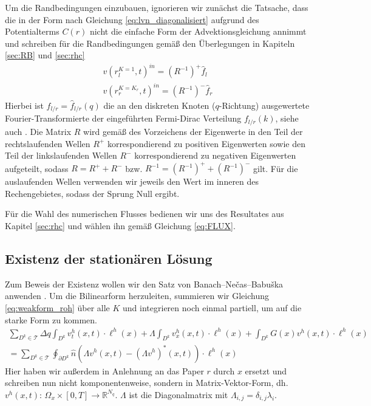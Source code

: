 Um die Randbedingungen einzubauen, ignorieren wir zunächst die Tatsache, dass die \lvn in der Form nach Gleichung \eqref{eq:lvn_diagonalisiert} aufgrund des Potentialterms $C(r)$ nicht die einfache Form der Advektionsgleichung annimmt und schreiben für die Randbedingungen gemäß den Überlegungen in Kapiteln \ref{sec:RB} und \ref{sec:rhc}
\begin{align}
  v(r_l^{K=1}, t)^{in} = (R^{-1})^+ \hat{f}_l  \\
  v(r_r^{K=K_r},t)^{in} = (R^{-1})^- \hat{f}_r
\end{align}
Hierbei ist $\hat{f}_{l/r} = \hat{f}_{l/r}(q)$ die an den diskreten  Knoten ($q$-Richtung) ausgewertete Fourier-Transformierte der eingeführten Fermi-Dirac Verteilung $f_{l/r}(k)$, siehe auch \cite{lukas1}. Die Matrix $R$ wird gemäß des Vorzeichens der Eigenwerte in den Teil der rechtslaufenden Wellen $R^+$ korrespondierend zu positiven Eigenwerten sowie den Teil der linkslaufenden Wellen $R^-$ korrespondierend zu negativen Eigenwerten aufgeteilt, sodass $R=R^+ + R^-$ bzw. $R^{-1} = (R^{-1})^+ + (R^{-1})^-$ gilt. Für die auslaufenden Wellen verwenden wir jeweils den Wert im inneren des Rechengebietes, sodass der Sprung Null ergibt. 

Für die Wahl des numerischen Flusses bedienen wir uns des Resultates aus Kapitel \ref{sec:rhc} und wählen ihn gemäß Gleichung \eqref{eq:FLUX}.

\subsection{Existenz der stationären Lösung}
Zum Beweis der Existenz wollen wir den Satz von Banach–Nečas–Babuška anwenden \cite{buch_ma}.  Um die Bilinearform herzuleiten, summieren wir Gleichung \eqref{eq:weakform_roh} über alle $K$ und integrieren noch einmal partiell, um auf die starke Form zu kommen.
\begin{align*}
  \sum_{D^k\in\mathcal{T}} \Delta q \int_{D^k} v^h_t(x,t)\cdot\ell^h(x) + \Lambda \int_{D^k} v^h_x(x,t) \cdot \ell^h(x) + \int_{D^k} G(x) v^h(x,t) \cdot \ell^h(x)\\
      = \sum_{D^k\in\mathcal{T}}\oint_{\partial D^k}  \hat{n} (\Lambda v^h(x,t) -(\Lambda v^h)^*(x,t))\cdot \ell^h(x)
\end{align*}
Hier haben wir außerdem in Anlehnung an das Paper $r$ durch $x$ ersetzt und schreiben nun nicht komponentenweise, sondern in Matrix-Vektor-Form, dh. ${v^h(x,t):\,  \Omega_x \times [0,T] \rightarrow \mathbb{R}^{N_q}}$. $\Lambda$ ist die Diagonalmatrix mit $\Lambda_{i,j} = \delta_{i,j}\lambda_i$.

